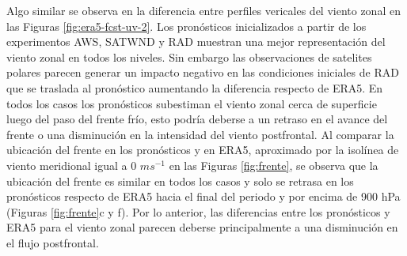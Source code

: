 \documentclass[12pt,oneside,a4paper]{reedthesis}
\begin{document}
Algo similar se observa en la diferencia entre perfiles vericales del viento zonal en las Figuras \ref{fig:era5-fcst-uv-2}. Los pronósticos inicializados a partir de los experimentos AWS, SATWND y RAD muestran una mejor representación del viento zonal en todos los niveles. Sin embargo las observaciones de satelites polares parecen generar un impacto negativo en las condiciones iniciales de RAD que se traslada al pronóstico aumentando la diferencia respecto de ERA5. En todos los casos los pronósticos subestiman el viento zonal cerca de superficie luego del paso del frente frío, esto podría deberse a un retraso en el avance del frente o una disminución en la intensidad del viento postfrontal. Al comparar la ubicación del frente en los pronósticos y en ERA5, aproximado por la isolínea de viento meridional igual a 0 \(ms^{-1}\) en las Figuras \ref{fig:frente}, se observa que la ubicación del frente es similar en todos los casos y solo se retrasa en los pronósticos respecto de ERA5 hacia el final del periodo y por encima de 900 hPa (Figuras \ref{fig:frente}c y f). Por lo anterior, las diferencias entre los pronósticos y ERA5 para el viento zonal parecen deberse principalmente a una disminución en el flujo postfrontal.
\end{document}
